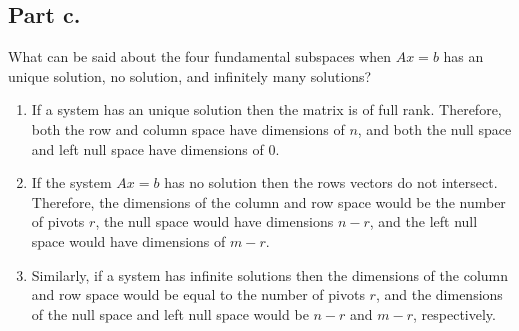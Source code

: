 \subsection{Part c.}
What can be said about the four fundamental subspaces when $Ax=b$ has an
unique solution, no solution, and infinitely many solutions?
\begin{mdframed}[style=MyFrame]
    \begin{enumerate}[label=(\alph*)]
        \item If a system has an unique solution then the matrix is of full
            rank. Therefore, both the row and column space have dimensions
            of $n$, and both the null space and left null space have
            dimensions of $0$.
            
        \item If the system $Ax=b$ has no solution then the rows vectors do
            not intersect. Therefore, the dimensions of the column and row
            space would be the number of pivots $r$, the null space
            would have dimensions $n-r$, and the left null space would have
            dimensions of $m-r$. 
            
        \item Similarly, if a system has infinite solutions then the
            dimensions of the column and row space would be equal to the
            number of pivots $r$, and the dimensions of the null space
            and left null space would be $n-r$ and $m-r$, respectively.
    \end{enumerate}
\end{mdframed}

